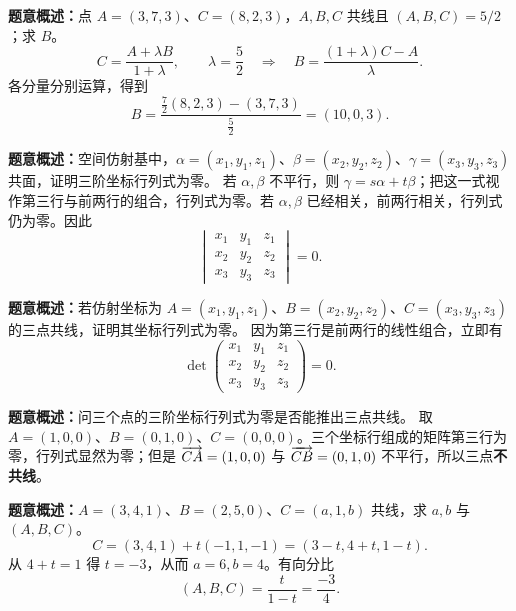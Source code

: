 \textbf{题意概述：}点 $A=(3,7,3)$、$C=(8,2,3)$，$A,B,C$ 共线且 $(A,B,C)=5/2$；求 $B$。
\[
C=\frac{A+\lambda B}{1+\lambda},\qquad \lambda=\frac52
\quad\Longrightarrow\quad B=\frac{(1+\lambda)C-A}{\lambda}.
\]
各分量分别运算，得到
\[
B=\frac{\tfrac72(8,2,3)-(3,7,3)}{\tfrac52}=(10,0,3).
\]

\textbf{题意概述：}空间仿射基中，$\alpha=(x_1,y_1,z_1)$、$\beta=(x_2,y_2,z_2)$、$\gamma=(x_3,y_3,z_3)$ 共面，证明三阶坐标行列式为零。
若 $\alpha,\beta$ 不平行，则 $\gamma=s\alpha+t\beta$；把这一式视作第三行与前两行的组合，行列式为零。若 $\alpha,\beta$ 已经相关，前两行相关，行列式仍为零。因此
\[
\boxed{\begin{vmatrix}x_1&y_1&z_1\\x_2&y_2&z_2\\x_3&y_3&z_3\end{vmatrix}=0}.
\]

\textbf{题意概述：}若仿射坐标为 $A=(x_1,y_1,z_1)$、$B=(x_2,y_2,z_2)$、$C=(x_3,y_3,z_3)$ 的三点共线，证明其坐标行列式为零。
因为第三行是前两行的线性组合，立即有
\[
\det\begin{pmatrix}x_1&y_1&z_1\\x_2&y_2&z_2\\x_3&y_3&z_3\end{pmatrix}=0.
\]

\textbf{题意概述：}问三个点的三阶坐标行列式为零是否能推出三点共线。
取 $A=(1,0,0)$、$B=(0,1,0)$、$C=(0,0,0)$。三个坐标行组成的矩阵第三行为零，行列式显然为零；但是 $\overrightarrow{CA}=(1,0,0)$ 与 $\overrightarrow{CB}=(0,1,0)$ 不平行，所以三点\textbf{不共线}。

\textbf{题意概述：}$A=(3,4,1)$、$B=(2,5,0)$、$C=(a,1,b)$ 共线，求 $a,b$ 与 $(A,B,C)$。
\[
C=(3,4,1)+t(-1,1,-1)=(3-t,4+t,1-t).
\]
从 $4+t=1$ 得 $t=-3$，从而 $a=6,b=4$。有向分比
\[
(A,B,C)=\frac t{1-t}=\frac{-3}{4}.
\]
